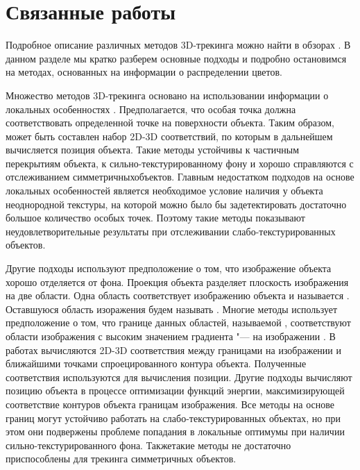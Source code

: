 \section{Связанные работы}\label{related-work}

Подробное описание различных методов 3D-трекинга можно найти в обзорах
\cite{LepetitSurvey,MarchandSurvey}.
В данном разделе мы кратко разберем основные подходы и
подробно остановимся на методах, основанных на информации о распределении
цветов.

Множество методов 3D-трекинга
\cite{Hinterstoisser2007,Vacchetti2004,Lourakis2013,Pauwels2013}
основано на использовании информации о локальных
особенностях \cite{AKAZE,SIFT,ShiAndTomasi,TomasiAndKanade,SIFT,PyrLK}.
Предполагается, что особая точка должна соответствовать определенной точке на 
поверхности объекта. Таким образом, может быть составлен набор 2D-3D 
соответствий, по которым в дальнейшем вычисляется
позиция объекта. Такие методы устойчивы к частичным перекрытиям объекта, к
сильно-текстурированному фону и хорошо справляются с отслеживанием
симметричныхобъектов. Главным недостатком подходов на основе локальных
особенностей
является
необходимое условие наличия у объекта неоднородной текстуры, на которой можно
было бы задетектировать достаточно большое количество особых точек. Поэтому
такие методы показывают неудовлетворительные результаты при отслеживании
слабо-текстурированных объектов.

Другие подходы используют предположение о том, что изображение объекта хорошо
отделяется от фона. Проекция объекта разделяет плоскость изображения на две
области. Одна область соответствует изображению объекта и называется
. Оставшуюся область изоражения будем называть
. Многие методы использует предположение о том, что границе
данных областей, называемой , соответствуют области изображения
с
высоким значением градиента "---  на изображении \cite{CANNY}. В
работах
\cite{RAPID,Marchand2003,Choi2012,Marchand2006,Klein2006,SeoHinterstoisser2014,WangZhong2015,Damen2012,VacchettiEdges2004}
вычисляются 2D-3D соответствия между границами на изображении и ближайшими
точками спроецированного контура объекта. Полученные соответствия используются
для вычисления позиции. Другие подходы
\cite{WangZhong2017,Marchand2001,Bugaev_2018_ECCV} вычисляют позицию объекта в
процессе оптимизации функций энергии, максимизирующей соответствие контуров
объекта границам изображения. Все методы на основе границ могут устойчиво
работать на слабо-текстурированных объектах, но при этом они подвержены
проблеме
попадания в локальные оптимумы при наличии сильно-текстурированного фона.
Такжетакие методы не достаточно приспособлены для трекинга симметричных
объектов.

